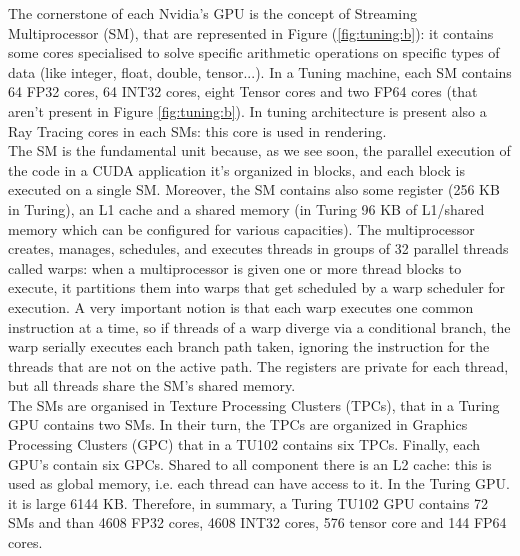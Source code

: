 The cornerstone of each Nvidia's GPU is the concept of Streaming Multiprocessor (SM), that are represented in Figure (\ref{fig:tuning:b}): it contains some cores specialised to solve specific arithmetic operations on specific types of data (like integer, float, double, tensor...).
In a Tuning machine, each SM contains 64 FP32 cores, 64 INT32 cores, eight Tensor cores and two FP64 cores (that aren't present in Figure \ref{fig:tuning:b}). In tuning architecture is present also a Ray Tracing cores in each SMs: this core is used in rendering.\\
The SM is the fundamental unit because, as we see soon, the parallel execution of the code in a CUDA application it's organized in blocks, and each block is executed on a single SM. 
Moreover, the SM contains also some register (256 KB in Turing), an L1 cache and a shared memory (in Turing 96 KB of L1/shared memory which can be configured for various capacities). 
The multiprocessor creates, manages, schedules, and executes threads in groups of
32 parallel threads called warps: when a multiprocessor is given one or more thread blocks to execute, it partitions them into warps that get scheduled by a warp scheduler for execution. 
A very important notion is that each warp executes one common instruction at a time, so if threads of a warp diverge via a conditional branch, the warp serially executes each branch path taken, ignoring the instruction for the threads that are not on the active path. 
The registers are private for each thread, but all threads share the SM's shared memory.\\
The SMs are organised in Texture Processing Clusters (TPCs), that in a Turing GPU contains two SMs.
In their turn, the TPCs are organized in Graphics Processing Clusters (GPC) that in a TU102 contains six TPCs. Finally, each GPU's contain six GPCs. Shared to all component there is an L2 cache: this is used as global memory, i.e. each thread can have access to it. In the Turing GPU. it is large 6144 KB.
Therefore, in summary, a Turing TU102 GPU contains 72 SMs and than 4608 FP32 cores, 4608 INT32 cores, 576 tensor core and 144 FP64 cores.

